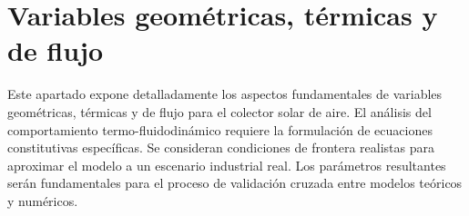 \section{Variables geométricas, térmicas y de flujo}
\label{sec:cap04_variables}

Este apartado expone detalladamente los aspectos fundamentales de variables geométricas, térmicas y de flujo para el colector solar de aire.
El análisis del comportamiento termo-fluidodinámico requiere la formulación de ecuaciones constitutivas específicas.
Se consideran condiciones de frontera realistas para aproximar el modelo a un escenario industrial real.
Los parámetros resultantes serán fundamentales para el proceso de validación cruzada entre modelos teóricos y numéricos.
